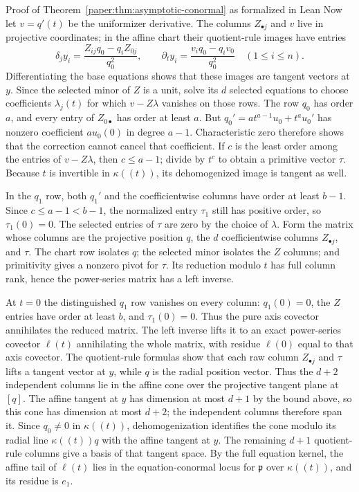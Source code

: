 \documentclass[11pt]{amsart}
\numberwithin{equation}{section}
\theoremstyle{plain}
\theoremstyle{remark}
\begin{document}
\begin{AIaddition}{Proof of Theorem~\ref{paper:thm:asymptotic-conormal} as formalized in Lean}
Now let $v=q'(t)$ be the uniformizer derivative. The columns $Z_{\bullet j}$
and $v$ live in projective coordinates; in the affine chart their quotient-rule
images have entries
\[
 \delta_j y_i=\frac{Z_{ij}q_0-q_iZ_{0j}}{q_0^2},\qquad
 \partial_t y_i=\frac{v_iq_0-q_iv_0}{q_0^2}\quad(1\le i\le n).
\]
Differentiating the base equations shows that these images are tangent vectors
at $y$. Since the selected minor of $Z$ is a unit, solve its $d$ selected
equations to choose coefficients
$\lambda_j(t)$ for which $v-Z\lambda$ vanishes on those rows. The row $q_0$
has order $a$, and every entry of $Z_{0\bullet}$ has order at least $a$.
But $q_0'=a t^{a-1}u_0+t^a u_0'$ has nonzero coefficient
$a u_0(0)$ in degree $a-1$. Characteristic zero therefore shows that the
correction cannot cancel that coefficient. If $c$ is the least order among
the entries of $v-Z\lambda$, then $c\le a-1$; divide by $t^c$ to obtain a
primitive vector $\tau$. Because $t$ is invertible in $\kappa((t))$, its
dehomogenized image is tangent as well.

In the $q_1$ row, both $q_1'$ and the coefficientwise columns have order at
least $b-1$. Since $c\le a-1<b-1$, the normalized entry $\tau_1$ still has
positive order, so $\tau_1(0)=0$. The selected entries of $\tau$ are zero by
the choice of $\lambda$. Form the matrix whose columns are the projective
position $q$, the $d$ coefficientwise columns $Z_{\bullet j}$, and $\tau$.
The chart row isolates $q$; the selected minor isolates the $Z$ columns; and
primitivity gives a nonzero pivot for $\tau$. Its reduction modulo $t$ has
full column rank, hence the power-series matrix has a left inverse.

At $t=0$ the distinguished $q_1$ row vanishes on every column: $q_1(0)=0$,
the $Z$ entries have order at least $b$, and $\tau_1(0)=0$. Thus the pure
axis covector annihilates the reduced matrix. The left inverse lifts it to an
exact power-series covector $\ell(t)$ annihilating the whole matrix, with
residue $\ell(0)$ equal to that axis covector. The quotient-rule formulas show
that each raw column $Z_{\bullet j}$ and $\tau$ lifts a tangent vector at $y$,
while $q$ is the radial position vector. Thus the $d+2$ independent columns
lie in the affine cone over the projective tangent plane at $[q]$. The affine
tangent at $y$ has dimension at most $d+1$ by the bound above, so this cone
has dimension at most $d+2$; the independent columns therefore span it. Since
$q_0\ne0$ in $\kappa((t))$, dehomogenization identifies the cone modulo its
radial line $\kappa((t))q$ with the affine tangent at $y$. The remaining
$d+1$ quotient-rule columns give a basis of that tangent space. By the full
equation kernel, the affine tail of $\ell(t)$ lies
in the equation-conormal locus for $\mathfrak p$ over $\kappa((t))$, and its
residue is $e_1$.


\end{AIaddition}
\end{document}
